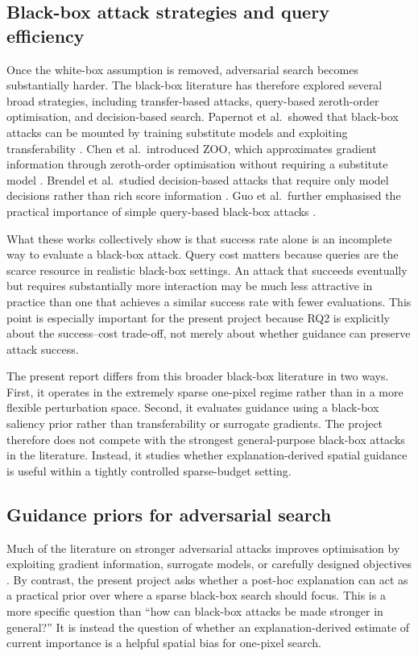 \subsection{Black-box attack strategies and query efficiency}
Once the white-box assumption is removed, adversarial search becomes substantially harder.
The black-box literature has therefore explored several broad strategies, including transfer-based attacks, query-based zeroth-order optimisation, and decision-based search.
Papernot et al.\ showed that black-box attacks can be mounted by training substitute models and exploiting transferability \cite{papernot2017practical}.
Chen et al.\ introduced ZOO, which approximates gradient information through zeroth-order optimisation without requiring a substitute model \cite{chen2017zoo}.
Brendel et al.\ studied decision-based attacks that require only model decisions rather than rich score information \cite{brendel2018decision}.
Guo et al.\ further emphasised the practical importance of simple query-based black-box attacks \cite{guo2019simplebb}.

What these works collectively show is that success rate alone is an incomplete way to evaluate a black-box attack.
Query cost matters because queries are the scarce resource in realistic black-box settings.
An attack that succeeds eventually but requires substantially more interaction may be much less attractive in practice than one that achieves a similar success rate with fewer evaluations.
This point is especially important for the present project because RQ2 is explicitly about the success--cost trade-off, not merely about whether guidance can preserve attack success.

The present report differs from this broader black-box literature in two ways.
First, it operates in the extremely sparse one-pixel regime rather than in a more flexible perturbation space.
Second, it evaluates guidance using a black-box saliency prior rather than transferability or surrogate gradients.
The project therefore does not compete with the strongest general-purpose black-box attacks in the literature.
Instead, it studies whether explanation-derived spatial guidance is useful within a tightly controlled sparse-budget setting.

\subsection{Guidance priors for adversarial search}
Much of the literature on stronger adversarial attacks improves optimisation by exploiting gradient information, surrogate models, or carefully designed objectives \cite{madry2018towards,chen2017zoo,guo2019simplebb}.
By contrast, the present project asks whether a post-hoc explanation can act as a practical prior over where a sparse black-box search should focus.
This is a more specific question than ``how can black-box attacks be made stronger in general?''
It is instead the question of whether an explanation-derived estimate of current importance is a helpful spatial bias for one-pixel search.

